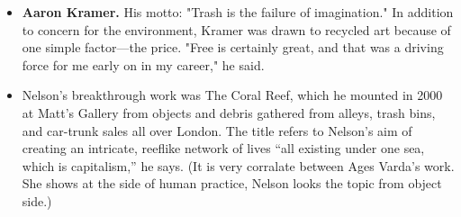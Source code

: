 \begin{itemize}
\item \textbf{Aaron Kramer.} His motto: "Trash is the failure of imagination." \cite{meyer2007turning} In addition to concern for the environment, Kramer was drawn to recycled art because of one simple factor---the price. "Free is certainly great, and that was a driving force for me early on in my career," he said.

\item Nelson’s breakthrough work was The Coral Reef, which he mounted in 2000 at Matt’s Gallery from objects and debris gathered from alleys, trash bins, and car-trunk sales all over London. The title refers to Nelson’s aim of creating an intricate, reeflike network of lives “all existing under one sea, which is capitalism,” he says. (It is very corralate between Ages Varda's work. She shows at the side of human practice, Nelson looks the topic from object side.)


\end{itemize}
